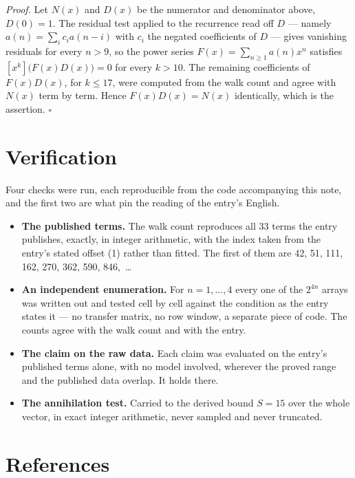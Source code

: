 \documentclass[11pt]{article}
\theoremstyle{definition}
\begin{document}
{\itshape Proof.} Let $N(x)$ and $D(x)$ be the numerator and denominator above, $D(0)=1$. The residual test applied to the recurrence read off $D$ --- namely $a(n) = \sum_i c_i a(n-i)$ with $c_i$ the negated coefficients of $D$ --- gives vanishing residuals for every $n > 9$, so the power series $F(x)=\sum_{n\ge 1}a(n)x^n$ satisfies $[x^k]\bigl(F(x)D(x)\bigr) = 0$ for every $k > 10$. The remaining coefficients of $F(x)D(x)$, for $k \le 17$, were computed from the walk count and agree with $N(x)$ term by term. Hence $F(x)D(x) = N(x)$ identically, which is the assertion. $\square$

\section{Verification}

Four checks were run, each reproducible from the code accompanying this note, and the first two are what pin the reading of the entry's English.

\begin{itemize}

\item {\bfseries The published terms.} The walk count reproduces all 33 terms the entry publishes, exactly, in integer arithmetic, with the index taken from the entry's stated offset (1) rather than fitted. The first of them are 42, 51, 111, 162, 270, 362, 590, 846,~\dots

\item {\bfseries An independent enumeration.} For $n = 1,\dots,4$ every one of the $2^{4n}$ arrays was written out and tested cell by cell against the condition as the entry states it --- no transfer matrix, no row window, a separate piece of code. The counts agree with the walk count and with the entry.

\item {\bfseries The claim on the raw data.} Each claim was evaluated on the entry's published terms alone, with no model involved, wherever the proved range and the published data overlap. It holds there.

\item {\bfseries The annihilation test.} Carried to the derived bound $S = 15$ over the whole vector, in exact integer arithmetic, never sampled and never truncated.

\end{itemize}

\section{References}
\end{document}
